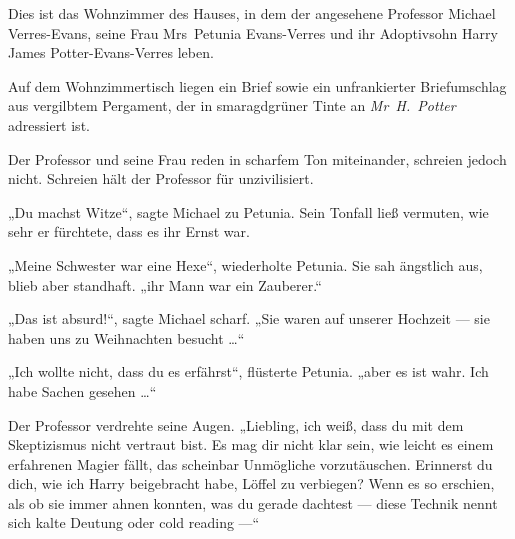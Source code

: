 Dies ist das Wohnzimmer des Hauses, in dem der angesehene Professor Michael Verres-Evans, seine Frau Mrs~Petunia Evans-Verres und ihr Adoptivsohn Harry James Potter-Evans-Verres leben.

Auf dem Wohnzimmertisch liegen ein Brief sowie ein unfrankierter Briefumschlag aus vergilbtem Pergament, der in smaragdgrüner Tinte an \emph{Mr~H.~Potter} adressiert ist.

Der Professor und seine Frau reden in scharfem Ton miteinander, schreien jedoch nicht. Schreien hält der Professor für unzivilisiert.

„Du machst Witze“, sagte Michael zu Petunia. Sein Tonfall ließ vermuten, wie sehr er fürchtete, dass es ihr Ernst war.

„Meine Schwester war eine Hexe“, wiederholte Petunia. Sie sah ängstlich aus, blieb aber standhaft. „ihr Mann war ein Zauberer.“

„Das ist absurd!“, sagte Michael scharf.
„Sie waren auf unserer Hochzeit — sie haben uns zu Weihnachten besucht …“

„Ich wollte nicht, dass du es erfährst“, flüsterte Petunia. „aber es ist wahr. Ich habe Sachen gesehen …“

Der Professor verdrehte seine Augen.
„Liebling, ich weiß, dass du mit dem Skeptizismus nicht vertraut bist. Es mag dir nicht klar sein, wie leicht es einem erfahrenen Magier fällt, das scheinbar Unmögliche vorzutäuschen. Erinnerst du dich, wie ich Harry beigebracht habe, Löffel zu verbiegen? Wenn es so erschien, als ob sie immer ahnen konnten, was du gerade dachtest — diese Technik nennt sich kalte Deutung oder cold reading —“ %

